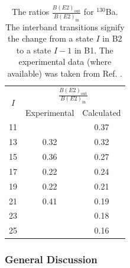 \begin{table}
    \centering
    \begin{tabular}{|c|cc|}
    \hline
    \multirow{2}{*}{$I$} & \multicolumn{2}{c|}{$\frac{B(E2)_\text{out}}{B(E2)_\text{in}}$} \\ \cline{2-3} 
                         & \multicolumn{1}{c|}{Experimental}          & Calculated         \\ \hline
    11                   & \multicolumn{1}{c|}{}                      & 0.37           \\ \hline
    13                   & \multicolumn{1}{c|}{0.32}                  & 0.32           \\ \hline
    15                   & \multicolumn{1}{c|}{0.36}                  & 0.27           \\ \hline
    17                   & \multicolumn{1}{c|}{0.22}                  & 0.24           \\ \hline
    19                   & \multicolumn{1}{c|}{0.22}                  & 0.21           \\ \hline
    21                   & \multicolumn{1}{c|}{0.41}                  & 0.19           \\ \hline
    23                   & \multicolumn{1}{c|}{}                      & 0.18           \\ \hline
    25                   & \multicolumn{1}{c|}{}                      & 0.16           \\ \hline
    \end{tabular}%
    \caption{The ratios $\frac{B(E2)_\text{out}}{B(E2)_\text{in}}$ for $^{130}$Ba. The interband transitions signify the change from a state $I$ in B2 to a state $I-1$ in B1. The experimental data (where available) was taken from Ref. \cite{petrache2019diversity,chen2019transverse}.}
    \label{BE2-out-in-ratio-130Ba}
\end{table}

\subsubsection{General Discussion}

